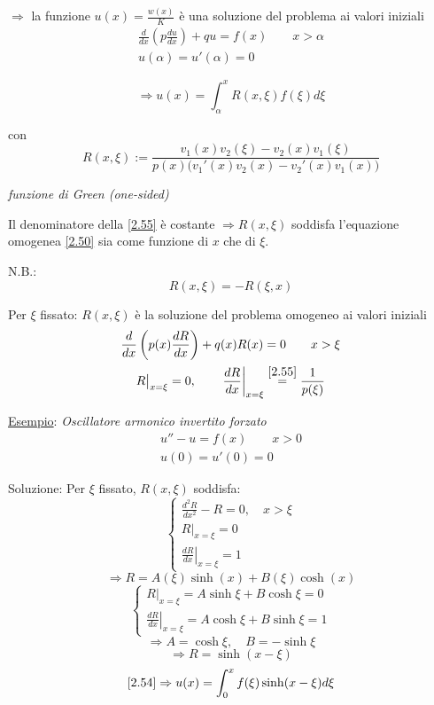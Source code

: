 \documentclass[a4paper,11pt]{report}
\begin{document}
$\Rightarrow$  la funzione $u(x)=\frac{w(x)}{K}$ \`e una soluzione del problema ai valori iniziali
\begin{equation}
\begin{gathered}
\frac{d}{dx}\left(p\frac{du}{dx}\right) + qu=f(x) \qquad x>\alpha \\
u(\alpha)=u'(\alpha)=0
\end{gathered}
\label{2.53}
\end{equation}

\begin{equation}
\Rightarrow u(x)=\int_\alpha^xR(x,\xi)f(\xi)d\xi
\label{2.54}
\end{equation}

con 
\begin{equation}
R(x,\xi):=\frac{v_1(x)v_2(\xi)-v_2(x)v_1(\xi)}{p(x)\big(v_1'(x)v_2(x)-v_2'(x)v_1(x)\big)}
\label{2.55}
\end{equation}
\centerline{\emph{funzione di Green (one-sided)}}

\medskip

Il denominatore della \eqref{2.55} \`e costante $\Rightarrow R(x,\xi)$ soddisfa l'equazione omogenea \eqref{2.50} sia come funzione di $x$ che di $\xi$. 

N.B.:
\[
R(x,\xi)=-R(\xi,x)
\]

Per $\xi$ fissato: $R(x,\xi)$ \`e la soluzione del problema omogeneo ai valori iniziali
\begin{equation}
\begin{gathered}
\frac{d}{dx}\left(p(x)\frac{dR}{dx}\right) + q(x)R(x)=0 \qquad x>\xi \\
R \big|_{x=\xi}=0, \qquad \left.\frac{dR}{dx}\right|_{x=\xi}\overset{\eqref{2.55}}{=}\frac{1}{p(\xi)}
\end{gathered}
\label{2.56}
\end{equation}

\medskip

\underline{Esempio}: \emph{Oscillatore armonico invertito forzato}
\[
\begin{gathered}
u'' - u =f(x) \qquad x>0 \\
u(0)=u'(0)=0
\end{gathered}
\]

Soluzione: Per $\xi$ fissato, $R(x,\xi)$ soddisfa:
\[
\begin{cases}
\frac{d^2R}{dx^2}-R=0, \quad x>\xi \\
R|_{x=\xi}=0\\
\left.\frac{dR}{dx}\right|_{x=\xi}=1
\end{cases}
\]
\[
\Rightarrow R= A(\xi)\sinh(x)+B(\xi)\cosh(x)
\]
\[
\begin{cases}
R|_{x=\xi}=A\sinh\xi + B \cosh \xi =0\\
\left.\frac{dR}{dx}\right|_{x=\xi}=A\cosh\xi + B \sinh \xi =1
\end{cases}
\]
\[
\Rightarrow A=\cosh \xi, \quad B=-\sinh \xi
\]
\[
 \Rightarrow R=\sinh(x-\xi)
\]
\[
\eqref{2.54}\Rightarrow u(x)=\int_0^x f(\xi)\sinh(x-\xi)d\xi
\]
\end{document}
